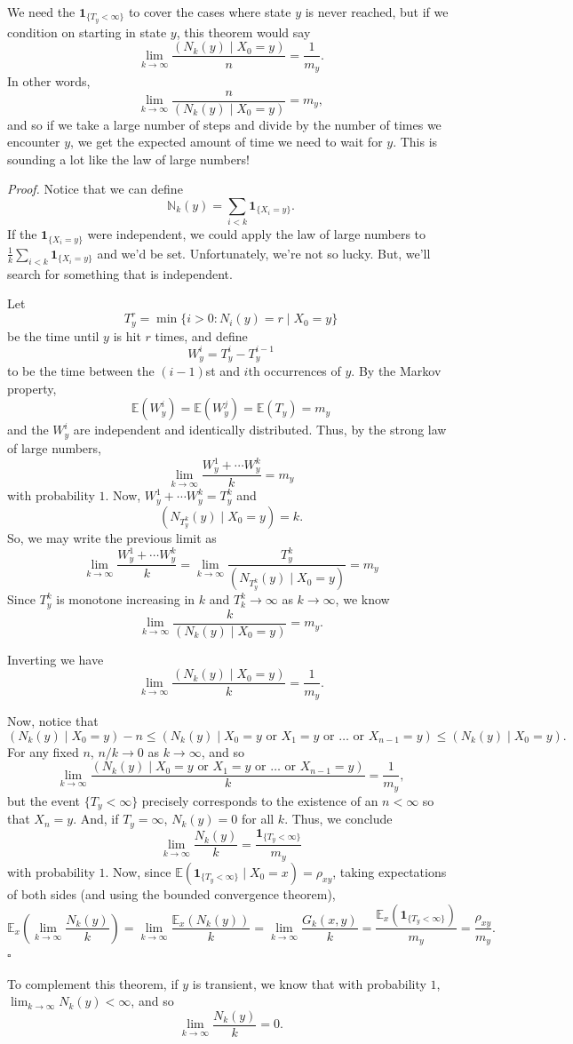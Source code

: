 \documentclass{problemset}
\newcommand{\N}{\mathbb{N}}
\newcommand{\E}{\mathbb{E}}
\newcommand{\1}{\mathbf{1}}
\newenvironment{proof}{\emph{Proof.}}{\hfill$\square$}
\begin{document}
	We need the $\1_{\{T_y<\infty\}}$ to cover the cases where state $y$ is never reached,
	but if we condition on starting in state $y$, this theorem would say
	\[
		\lim_{k\to\infty} \frac{(N_k(y)\mid X_0=y)}{n} = \frac{1}{m_y}.
	\]
	In other words, 
	\[
		\lim_{k\to\infty} \frac{n}{(N_k(y)\mid X_0=y)} = m_y,
	\]
	and so if we take a large number of steps and divide by the number of times we encounter $y$,
	we get the expected amount of time we need to wait for $y$.  This is sounding a
	lot like the law of large numbers!

	\begin{proof}
		Notice that we can define
		\[
			\N_k(y) = \sum_{i<k} \1_{\{X_i=y\}}.
		\]
		If the $\1_{\{X_i=y\}}$ were independent, we could apply the law of large numbers to
		$\frac{1}{k}\sum_{i<k} \1_{\{X_i=y\}}$ and we'd be set.  Unfortunately,
		we're not so lucky.  But, we'll search for something that is independent.

		Let
		\[
			T^r_y = \min\{i>0: N_i(y)=r\mid X_0=y\}
		\]
		be the time until $y$ is hit $r$ times, and define
		\[
			W^i_y = T^i_y-T^{i-1}_y
		\]
		to be the time between the $(i-1)$st and $i$th occurrences of $y$.
		By the Markov property, 
		\[
			\E(W_y^i) = \E(W_y^j) = \E(T_y) = m_y
		\]
		and the $W_y^i$ are independent and identically distributed.  Thus, by the strong
		law of large numbers,
		\[
			\lim_{k\to\infty} \frac{W_y^1+\cdots W_y^k}{k} = m_y
		\]
		with probability $1$.  Now, $W_y^1+\cdots W_y^k=T_y^k$ and
		\[
			(N_{T_y^k}(y)\mid X_0=y) = k.
		\]
		So, we may write the previous limit as
		\[
			\lim_{k\to\infty} \frac{W_y^1+\cdots W_y^k}{k} = 
			\lim_{k\to\infty} \frac{T_y^k}{(N_{T_y^k}(y)\mid X_0=y)} = 
			m_y
		\]
		Since $T_y^k$ is monotone
		increasing in $k$ and $T_k^k\to\infty$ as $k\to\infty$, we know
		\[
			\lim_{k\to\infty} \frac{k}{(N_{k}(y)\mid X_0=y)} = 
			m_y.
		\]

		Inverting we have
		\[
			\lim_{k\to\infty} \frac{(N_{k}(y)\mid X_0=y)}{k} = 
			\frac{1}{m_y}.
		\]

		Now, notice that 
		\[
			(N_{k}(y)\mid X_0=y) -n \leq (N_{k}(y)\mid X_0=y\text{ or }X_1=y\text{ or \ldots\ or } X_{n-1}=y) \leq (N_{k}(y)\mid X_0=y).
		\]
		For any fixed $n$, $n/k\to0$ as $k\to\infty$, and so
		\[
			\lim_{k\to\infty} \frac{(N_{k}(y)\mid X_0=y\text{ or }X_1=y\text{ or \ldots\ or } X_{n-1}=y)}{k} = 
			\frac{1}{m_y},
		\]
		but the event $\{T_y<\infty\}$ precisely
		corresponds to the existence of an $n<\infty$ so that $X_n=y$. And, if $T_y=\infty$, $N_k(y)=0$ for all $k$.
		Thus, we conclude
		\[
			\lim_{k\to\infty} \frac{N_{k}(y)}{k} = 
			\frac{\1_{\{T_y<\infty\}}}{m_y}
		\]
		with probability $1$.  Now, since $\E(\1_{\{T_y<\infty\}}\mid X_0=x)=\rho_{xy}$, taking expectations
		of both sides (and using the bounded convergence theorem),
		\[
			\E_x\left(\lim_{k\to\infty} \frac{N_{k}(y)}{k}\right)
			=\lim_{k\to\infty} \frac{\E_x(N_{k}(y))}{k}
			=\lim_{k\to\infty} \frac{G_k(x,y)}{k}
			=\frac{\E_x(\1_{\{T_y<\infty\}})}{m_y} = \frac{\rho_{xy}}{m_y}.
		\]
	\end{proof}

	To complement this theorem, if $y$ is transient, we know that with probability $1$, $\lim_{k\to\infty} N_k(y) <\infty$,
	and so
	\[
		\lim_{k\to\infty} \frac{N_{k}(y)}{k} = 
		0.
	\]
\end{document}
